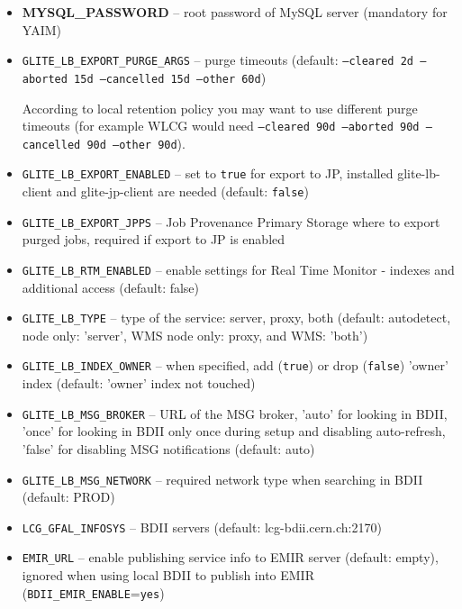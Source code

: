 \begin{itemize}
\item \textbf{MYSQL\_PASSWORD} -- root password of MySQL server (mandatory for YAIM)
\item \texttt{GLITE\_LB\_EXPORT\_PURGE\_ARGS} -- purge timeouts (default: \texttt{--cleared 2d --aborted 15d --cancelled 15d --other 60d})

According to local retention policy you may want to use different purge timeouts (for example WLCG would need \texttt{--cleared 90d --aborted 90d --cancelled 90d --other 90d}).
\item \texttt{GLITE\_LB\_EXPORT\_ENABLED} -- set to \texttt{true} for export to JP, installed glite-lb-client and glite-jp-client are needed (default: \texttt{false})
\item \texttt{GLITE\_LB\_EXPORT\_JPPS} -- Job Provenance Primary Storage where to export purged jobs, required if export to JP is enabled
\item \texttt{GLITE\_LB\_RTM\_ENABLED} -- enable settings for Real Time Monitor - indexes and additional access (default: false)
\item \texttt{GLITE\_LB\_TYPE} -- type of the \LB service: server, proxy, both (default: autodetect, \LB node only: 'server', WMS node only: proxy, \LB and WMS: 'both')
\item \texttt{GLITE\_LB\_INDEX\_OWNER} -- when specified, add (\texttt{true}) or drop (\texttt{false}) 'owner' index (default: 'owner' index not touched)
\item \texttt{GLITE\_LB\_MSG\_BROKER} -- URL of the MSG broker, 'auto' for looking in BDII, 'once' for looking in BDII only once during setup and disabling auto-refresh, 'false' for disabling MSG notifications (default: auto)
\item \texttt{GLITE\_LB\_MSG\_NETWORK} -- required network type when searching in BDII (default: PROD)
\item \texttt{LCG\_GFAL\_INFOSYS} -- BDII servers (default: lcg-bdii.cern.ch:2170)
\item \texttt{EMIR\_URL} -- enable publishing \LB service info to EMIR server (default: empty), ignored when using local BDII to publish into EMIR (\texttt{BDII\_EMIR\_ENABLE}=\texttt{yes})
\end{itemize}

